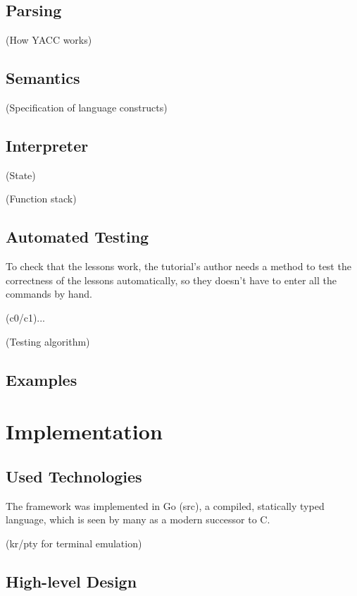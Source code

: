 \documentclass[twoside,parskip]{scrreprt}
\begin{document}
\section{Parsing}

(How YACC works)

\section{Semantics}

(Specification of language constructs)

\section{Interpreter}

(State)

(Function stack)

\section{Automated Testing}

To check that the lessons work, the tutorial's author needs a method to test the correctness of the lessons automatically, so they doesn't have to enter all the commands by hand.

(c0/c1)...

(Testing algorithm)

\section{Examples}

\chapter{Implementation}

\section{Used Technologies}

The framework was implemented in Go (src), a compiled, statically typed language, which is seen by many as a modern successor to C.

(kr/pty for terminal emulation)

\section{High-level Design}
\end{document}
